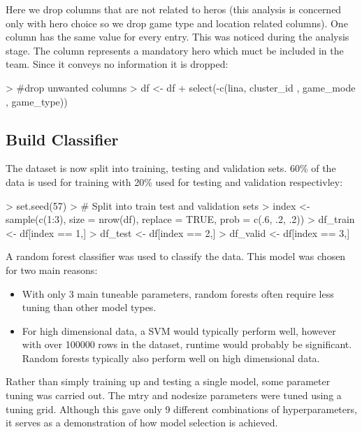 \documentclass[10pt]{article}
\begin{document}
Here we drop columns that are not related to heros (this analysis is concerned only with hero choice so we drop game type and location related columns). 
One column has the same value for every entry. This was noticed during the analysis stage. The column represents a mandatory hero which muct be included in the team. Since it conveys no information it is dropped:
\begin{Schunk}
\begin{Sinput}
> #drop unwanted columns
> df <- df%
+   select(-c(lina, cluster_id , game_mode , game_type))
\end{Sinput}
\end{Schunk}




\subsection{Build Classifier}
The dataset is now split into training, testing and validation sets. 60\% of the data is used for training with 20\% used for testing and validation respectivley:
\begin{Schunk}
\begin{Sinput}
> set.seed(57)
> # Split into train test and validation sets
> index <- sample(c(1:3), size = nrow(df), replace = TRUE, prob = c(.6, .2, .2))
> df_train <- df[index == 1,]
> df_test <- df[index == 2,]
> df_valid <- df[index == 3,]
\end{Sinput}
\end{Schunk}

A random forest classifier was used to classify the data. This model was chosen for two main reasons:
\begin{itemize}
  \item With only 3 main tuneable parameters, random forests often require less tuning than other model types.
  \item For high dimensional data, a SVM would typically perform well, however with over 100000 rows in the dataset, runtime would probably be significant. Random forests typically also perform well on high dimensional data.
\end{itemize}


Rather than simply training up and testing a single model, some parameter tuning was carried out. The mtry and nodesize parameters were tuned using a tuning grid. Although this gave only 9 different combinations of hyperparameters, it serves as a demonstration of how model selection is achieved.
\end{document}
